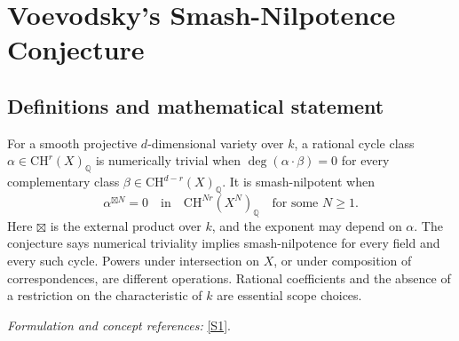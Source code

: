 \documentclass[11pt,a4paper]{article}
\newcommand{\Q}{\mathbb{Q}}
\newcommand{\sref}[2]{\hyperlink{source:#1:#2}{[S#2]}}
\newif\ifshowcatalogue
\newcommand{\cataloguescope}[1]{\ifshowcatalogue
 \paragraph{Exact scope in the supplied catalogue.}
 \begin{quote}\small #1\end{quote}\fi}
\numberwithin{equation}{section}
\begin{document}
\setcounter{section}{181}
\clearpage
\section{\texorpdfstring{Voevodsky's Smash-Nilpotence Conjecture}{Voevodsky's Smash-Nilpotence Conjecture}}\label{182}
\subsection{Definitions and mathematical statement}
For a smooth projective $d$-dimensional variety over $k$, a rational cycle class $\alpha\in\mathrm{CH}^r(X)_{\Q}$ is numerically trivial when
$\deg(\alpha\cdot\beta)=0$ for every complementary class $\beta\in\mathrm{CH}^{d-r}(X)_{\Q}$. It is smash-nilpotent when
\[
 \alpha^{\boxtimes N}=0\quad\text{in}\quad\mathrm{CH}^{Nr}(X^N)_{\Q}
 \quad\text{for some }N\ge1.
\]
Here $\boxtimes$ is the external product over $k$, and the exponent may depend on $\alpha$. The conjecture says numerical triviality implies smash-nilpotence for every field and every such cycle. Powers under intersection on $X$, or under composition of correspondences, are different operations. Rational coefficients and the absence of a restriction on the characteristic of $k$ are essential scope choices.
\par\smallskip\textit{Formulation and concept references:} \sref{182}{1}.
\cataloguescope{For every field k, every smooth projective k-variety X of dimension d, every integer 0<=r<=d, and every class alpha in CH\textasciicircum{}r(X)\_Q (codimension-r cycles modulo rational equivalence with rational coefficients), assume deg(alpha.beta)=0 for every beta in CH\textasciicircum{}(d-r)(X)\_Q. Voevodsky's smash-nilpotence assertion is that there exists an integer N>=1, depending on alpha, for which the N-fold EXTERNAL product alpha times ... times alpha is zero in CH\textasciicircum{}(Nr)(X\textasciicircum{}N)\_Q, where X\textasciicircum{}N is the fibre product over k. No algebraic-closure, characteristic-zero or geometric-connectedness hypothesis is imposed; disconnected smooth projective schemes are interpreted on their pure-dimensional components. The reverse implication, smash-nilpotent implies numerically trivial, is known, so this is equality of numerical and smash equivalence for rational cycles. Neither intersection powers on X, composition powers of correspondences, integral coefficients, nor a uniform or computable exponent replaces this assertion.}
\end{document}
